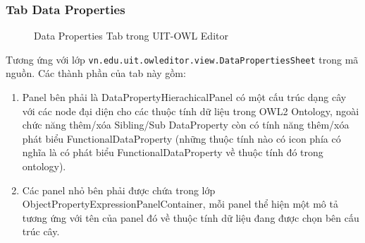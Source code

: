 \subsubsection{Tab Data Properties}
\begin{figure}[h!]
	\centering
	\caption{Data Properties Tab trong UIT-OWL Editor\label{overflow}}
\end{figure}
Tương ứng với lớp \verb|vn.edu.uit.owleditor.view.DataPropertiesSheet| trong mã nguồn. Các thành phần của tab này gồm:
\begin{enumerate}
\item Panel bên phải là DataPropertyHierachicalPanel có một cấu trúc dạng cây với các node đại diện cho các thuộc tính dữ liệu trong OWL2 Ontology, ngoài chức năng thêm/xóa Sibling/Sub DataProperty còn có tính năng thêm/xóa phát biểu FunctionalDataProperty (những thuộc tính nào có icon phía có nghĩa là có phát biểu FunctionalDataProperty về thuộc tính đó trong ontology).
\item Các panel nhỏ bên phải được chứa trong lớp ObjectPropertyExpressionPanelContainer, mỗi panel thể hiện một mô tả tương ứng với tên của panel đó về thuộc tính dữ liệu đang được chọn bên cấu trúc cây.
\end{enumerate}	

